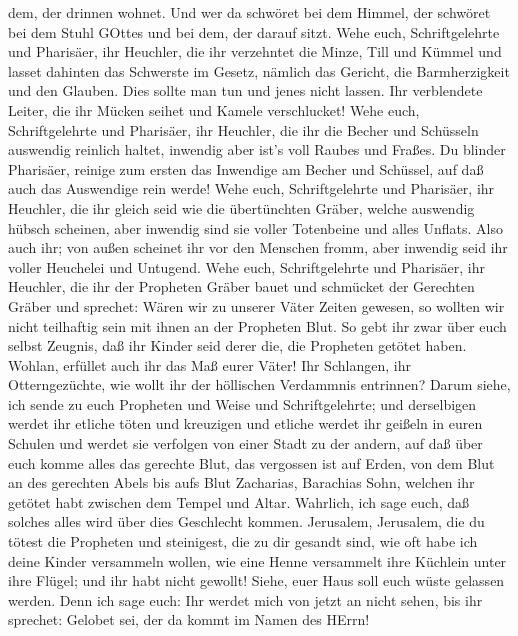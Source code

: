 dem, der drinnen wohnet.  Und wer da schwöret bei dem
Himmel, der schwöret bei dem Stuhl GOttes und bei dem, der darauf sitzt.
 Wehe euch, Schriftgelehrte und Pharisäer, ihr Heuchler,
die ihr verzehntet die Minze, Till und Kümmel und lasset dahinten das
Schwerste im Gesetz, nämlich das Gericht, die Barmherzigkeit und den
Glauben. Dies sollte man tun und jenes nicht lassen.  Ihr
verblendete Leiter, die ihr Mücken seihet und Kamele verschlucket!
 Wehe euch, Schriftgelehrte und Pharisäer, ihr Heuchler,
die ihr die Becher und Schüsseln auswendig reinlich haltet, inwendig
aber ist's voll Raubes und Fraßes.  Du blinder Pharisäer,
reinige zum ersten das Inwendige am Becher und Schüssel, auf daß auch
das Auswendige rein werde!  Wehe euch, Schriftgelehrte und
Pharisäer, ihr Heuchler, die ihr gleich seid wie die übertünchten
Gräber, welche auswendig hübsch scheinen, aber inwendig sind sie voller
Totenbeine und alles Unflats.  Also auch ihr; von außen
scheinet ihr vor den Menschen fromm, aber inwendig seid ihr voller
Heuchelei und Untugend.  Wehe euch, Schriftgelehrte und
Pharisäer, ihr Heuchler, die ihr der Propheten Gräber bauet und
schmücket der Gerechten Gräber  und sprechet: Wären wir zu
unserer Väter Zeiten gewesen, so wollten wir nicht teilhaftig sein mit
ihnen an der Propheten Blut.  So gebt ihr zwar über euch
selbst Zeugnis, daß ihr Kinder seid derer die, die Propheten getötet
haben.  Wohlan, erfüllet auch ihr das Maß eurer Väter!
 Ihr Schlangen, ihr Otterngezüchte, wie wollt ihr der
höllischen Verdammnis entrinnen?  Darum siehe, ich sende zu
euch Propheten und Weise und Schriftgelehrte; und derselbigen werdet ihr
etliche töten und kreuzigen und etliche werdet ihr geißeln in euren
Schulen und werdet sie verfolgen von einer Stadt zu der andern,
 auf daß über euch komme alles das gerechte Blut, das
vergossen ist auf Erden, von dem Blut an des gerechten Abels bis aufs
Blut Zacharias, Barachias Sohn, welchen ihr getötet habt zwischen dem
Tempel und Altar.  Wahrlich, ich sage euch, daß solches
alles wird über dies Geschlecht kommen.  Jerusalem,
Jerusalem, die du tötest die Propheten und steinigest, die zu dir
gesandt sind, wie oft habe ich deine Kinder versammeln wollen, wie eine
Henne versammelt ihre Küchlein unter ihre Flügel; und ihr habt nicht
gewollt!  Siehe, euer Haus soll euch wüste gelassen werden.
 Denn ich sage euch: Ihr werdet mich von jetzt an nicht
sehen, bis ihr sprechet: Gelobet sei, der da kommt im Namen des HErrn!

